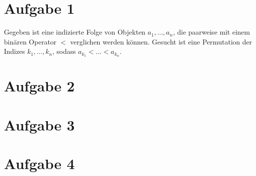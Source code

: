 \documentclass[10pt,a4paper]{article}
\begin{document}
\section{Aufgabe 1}
Gegeben ist eine indizierte Folge von Objekten $a_{1}, \dots, a_{n}$, die paarweise mit einem binären Operator $<$ verglichen werden können.
Gesucht ist eine Permutation der Indizes $k_{1}, \dots, k_{n}$, sodass $a_{k_{1}} < \dots < a_{k_{n}}$.

\section{Aufgabe 2}

\section{Aufgabe 3}

\section{Aufgabe 4}
\end{document}
